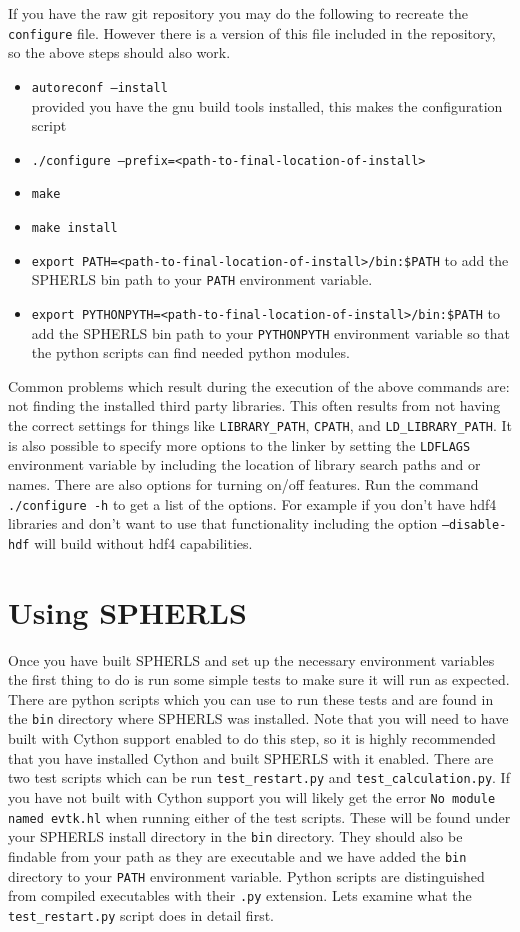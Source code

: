 \documentclass[12pt,a4paper]{book}
\begin{document}
If you have the raw git repository you may do the following to recreate the {\tt configure} file. However there is a version of this file included in the repository, so the above steps should also work.
\begin{itemize}
\item {\tt autoreconf --install} \\provided you have the gnu build tools installed, this makes the configuration script
\item {\tt ./configure --prefix=<path-to-final-location-of-install>}
\item {\tt make}
\item {\tt make install}
\item {\tt export PATH=<path-to-final-location-of-install>/bin:\$PATH} to add the SPHERLS bin path to your {\tt PATH} environment variable.
\item {\tt export PYTHONPYTH=<path-to-final-location-of-install>/bin:\$PATH} to add the SPHERLS bin path to your {\tt PYTHONPYTH} environment variable so that the python scripts can find needed python modules.
\end{itemize}

Common problems which result during the execution of the above commands are: not finding the installed third party libraries. This often results from not having the correct settings for things like {\tt LIBRARY\_PATH}, {\tt CPATH}, and {\tt LD\_LIBRARY\_PATH}. It is also possible to specify more options to the linker by setting the {\tt LDFLAGS} environment variable by including the location of library search paths and or names. There are also options for turning on/off features. Run the command {\tt ./configure -h} to get a list of the options. For example if you don't have hdf4 libraries and don't want to use that functionality including the option {\tt --disable-hdf} will build without hdf4 capabilities.

\chapter{Using SPHERLS}
Once you have built SPHERLS and set up the necessary environment variables the first thing to do is run some simple tests to make sure it will run as expected. There are python scripts which you can use to run these tests and are found in the {\tt bin} directory where SPHERLS was installed. Note that you will need to have built with Cython support enabled to do this step, so it is highly recommended that you have installed Cython and built SPHERLS with it enabled. There are two test scripts which can be run {\tt test\_restart.py} and {\tt test\_calculation.py}. If you have not built with Cython support you will likely get the error {\tt No module named evtk.hl} when running either of the test scripts. These will be found under your SPHERLS install directory in the {\tt bin} directory. They should also be findable from your path as they are executable and we have added the {\tt bin} directory to your {\tt PATH} environment variable. Python scripts are distinguished from compiled executables with their {\tt .py} extension. Lets examine what the {\tt test\_restart.py} script does in detail first.
\end{document}
